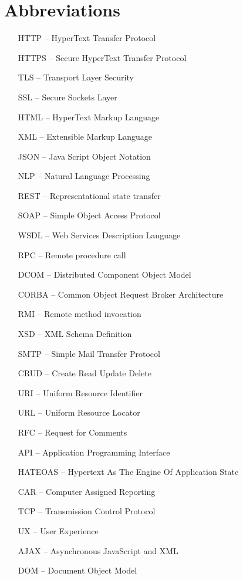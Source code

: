 \section*{Abbreviations}

\begin{itemize}[leftmargin=2cm, topsep=0pt, partopsep=5pt,itemsep=0pt,parsep=0pt]
\item[HTTP --] HyperText Transfer Protocol
\item[HTTPS --] Secure HyperText Transfer Protocol
\item[TLS --] Transport Layer Security
\item[SSL --] Secure Sockets Layer
\item[HTML --] HyperText Markup Language
\item[XML --] Extensible Markup Language
\item[JSON --] Java Script Object Notation
\item[NLP --] Natural Language Processing
\item[REST --] Representational state transfer
\item[SOAP --] Simple Object Access Protocol
\item[WSDL --] Web Services Description Language
\item[RPC --] Remote procedure call
\item[DCOM --] Distributed Component Object Model
\item[CORBA --] Common Object Request Broker Architecture
\item[RMI --] Remote method invocation
\item[XSD --] XML Schema Definition
\item[SMTP --] Simple Mail Transfer Protocol
\item[CRUD --] Create Read Update Delete
\item[URI --] Uniform Resource Identifier
\item[URL --] Uniform Resource Locator
\item[RFC --] Request for Comments
\item[API --] Application Programming Interface
\item[HATEOAS --] Hypertext As The Engine Of Application State
\item[CAR --] Computer Assigned Reporting
\item[TCP --] Transmission Control Protocol
\item[UX --] User Experience
\item[AJAX --] Asynchronous JavaScript and XML
\item[DOM --] Document Object Model

\end{itemize}
